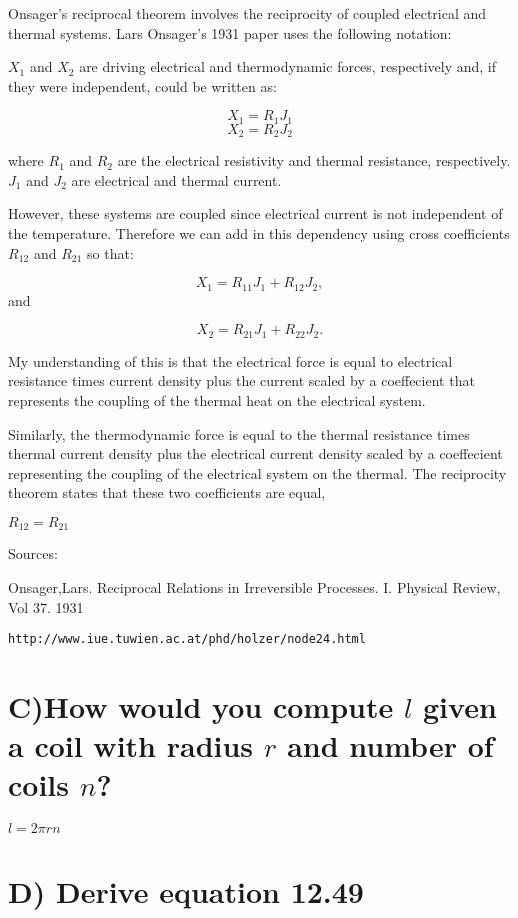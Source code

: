 \documentclass[overlapped,line,letterpaper]{res}
\begin{document}
\begin{resume}
Onsager's reciprocal theorem involves the reciprocity of coupled electrical and thermal systems. Lars Onsager's 1931 paper uses the following notation:


$X_1$ and $X_2$ are driving electrical and thermodynamic forces, respectively and, if they were independent, could be written as:

$$X_1 = R_1J_1$$
$$X_2 = R_2J_2$$


where $R_1$ and $R_2$ are the electrical resistivity and thermal resistance, respectively. $J_1$ and $J_2$ are electrical and thermal current.

However, these systems are coupled since electrical current is not independent of the temperature. Therefore we can add in this dependency using cross coefficients $R_{12}$ and $R_{21}$ so that:

$$X_1 = R_{11}J_1 + R_{12}J_2,$$ and

$$X_2 = R_{21}J_1 + R_{22}J_2.$$ 

My understanding of this is that the electrical force is equal to electrical resistance times current density plus the current  scaled by a coeffecient that represents the coupling of the thermal heat on the electrical system.

Similarly, the thermodynamic force is equal to the thermal resistance times thermal current density plus the electrical current density scaled by a coeffecient representing the coupling of the electrical system on the thermal. The reciprocity theorem states that these two coefficients are equal,

$R_{12}=R_{21}$

Sources:

Onsager,Lars. Reciprocal Relations in Irreversible Processes. I. Physical Review, Vol 37. 1931

\begin{verbatim}http://www.iue.tuwien.ac.at/phd/holzer/node24.html\end{verbatim} 
\section{C)How would you compute $l$ given a coil with radius $r$ and number of coils $n$?}


$l = 2\pi rn $

\section{D) Derive equation 12.49}


\end{resume}
\end{document}
